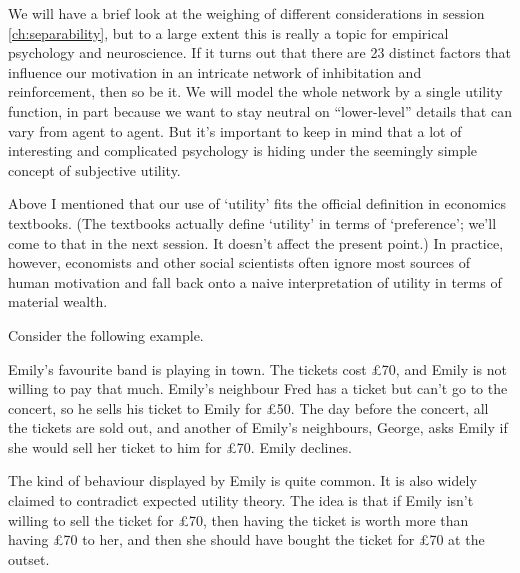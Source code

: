 We will have a brief look at the weighing of different considerations
in session \ref{ch:separability}, but to a large extent this is really
a topic for empirical psychology and neuroscience. If it turns out
that there are 23 distinct factors that influence our motivation in an
intricate network of inhibitation and reinforcement, then so be it. We
will model the whole network by a single utility function, in part
because we want to stay neutral on ``lower-level'' details that can
vary from agent to agent.  But it's important to keep in mind that a
lot of interesting and complicated psychology is hiding under the
seemingly simple concept of subjective utility.



Above I mentioned that our use of `utility' fits the official
definition in economics textbooks. (The textbooks actually define
`utility' in terms of `preference'; we'll come to that in the next
session. It doesn't affect the present point.) In practice, however,
economists and other social scientists often ignore most sources of
human motivation and fall back onto a naive interpretation of utility
in terms of material wealth.

Consider the following example.

\begin{example}
  Emily's favourite band is playing in town. The tickets cost £70, and
  Emily is not willing to pay that much. Emily's neighbour Fred has a
  ticket but can't go to the concert, so he sells his ticket to Emily
  for £50. The day before the concert, all the tickets are sold out,
  and another of Emily's neighbours, George, asks Emily if she would
  sell her ticket to him for £70. Emily declines.
\end{example}

The kind of behaviour displayed by Emily is quite common. It is also
widely claimed to contradict expected utility theory. The idea is that
if Emily isn't willing to sell the ticket for £70, then having the
ticket is worth more than having £70 to her, and then she should have
bought the ticket for £70 at the outset.

